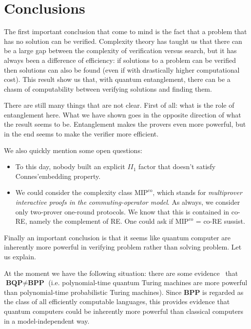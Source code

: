 \section*{Conclusions}

The first important conclusion that come to mind is the fact that a problem that has no solution can be verified. Complexity theory has taught us that there can be a large gap between the complexity of verification versus search, but it has always been a difference of efficiency: if solutions to a problem can be verified then solutions can also be found (even if with drastically higher computational cost). This result show us that, with quantum entanglement, there can be a chasm of computability between verifying solutions and finding them.


There are still many things that are not clear. First of all: what is the role of entanglement here. What we have shown goes in the opposite direction of what the result seems to be. Entanglement makes the provers even more powerful, but in the end seems to make the verifier more efficient.

We also quickly mention some open questions:
\begin{itemize}

    \item To this day, nobody built an explicit $II_1$ factor that doesn't satisfy Connes'embedding property.
    \item We could consider the complexity class $\text{MIP}^\text{co}$, which stands for \emph{multiprover interactive proofs in the commuting-operator model}. As always, we consider only two-prover one-round protocols. We know that this is contained in co-RE, namely the complement of RE. One could ask if $\text{MIP}^\text{co}$ = co-RE sussist.
    
\end{itemize}

Finally an important conclusion is that it seems like quantum computer are inherently more powerful in verifying problem rather than solving problem. Let us explain.

At the moment we have the following situation: there are some evidence~\cite{Bennett_1997} that $\textbf{BQP} \neq \textbf{BPP}$ (i.e. polynomial-time quantum Turing machines are more powerful than polynomial-time probabilistic Turing machines). Since \textbf{BPP} is regarded as the class of all efficiently computable languages, this provides evidence that quantum computers could be inherently more powerful than classical computers in a model-independent way.

